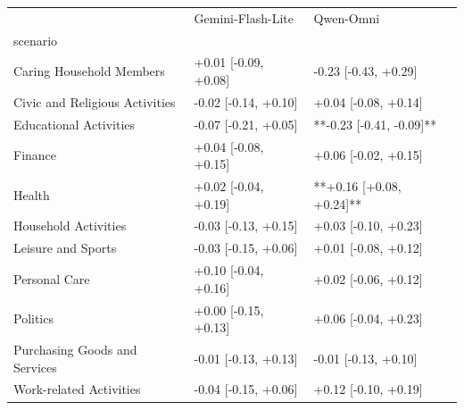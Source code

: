 \begin{tabular}{lll}
\toprule
 & Gemini-Flash-Lite & Qwen-Omni \\
scenario &  &  \\
\midrule
Caring Household Members & +0.01 [-0.09, +0.08] & -0.23 [-0.43, +0.29] \\
Civic and Religious Activities & -0.02 [-0.14, +0.10] & +0.04 [-0.08, +0.14] \\
Educational Activities & -0.07 [-0.21, +0.05] & **-0.23 [-0.41, -0.09]** \\
Finance & +0.04 [-0.08, +0.15] & +0.06 [-0.02, +0.15] \\
Health & +0.02 [-0.04, +0.19] & **+0.16 [+0.08, +0.24]** \\
Household Activities & -0.03 [-0.13, +0.15] & +0.03 [-0.10, +0.23] \\
Leisure and Sports & -0.03 [-0.15, +0.06] & +0.01 [-0.08, +0.12] \\
Personal Care & +0.10 [-0.04, +0.16] & +0.02 [-0.06, +0.12] \\
Politics & +0.00 [-0.15, +0.13] & +0.06 [-0.04, +0.23] \\
Purchasing Goods and Services & -0.01 [-0.13, +0.13] & -0.01 [-0.13, +0.10] \\
Work-related Activities & -0.04 [-0.15, +0.06] & +0.12 [-0.10, +0.19] \\
\bottomrule
\end{tabular}
